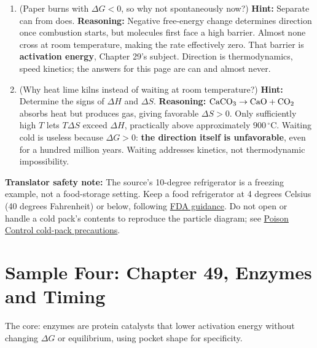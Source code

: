\begin{enumerate}[itemsep=3pt]
\item (Paper burns with $\Delta G<0$, so why not spontaneously now?) \textbf{Hint:} Separate can from does. \textbf{Reasoning:} Negative free-energy change determines direction once combustion starts, but molecules first face a high barrier. Almost none cross at room temperature, making the rate effectively zero. That barrier is \textbf{activation energy}, Chapter 29's subject. Direction is thermodynamics, speed kinetics; the answers for this page are can and almost never.
\item (Why heat lime kilns instead of waiting at room temperature?) \textbf{Hint:} Determine the signs of $\Delta H$ and $\Delta S$. \textbf{Reasoning:} $\mathrm{CaCO_3} \rightarrow \mathrm{CaO} + \mathrm{CO_2}$ absorbs heat but produces gas, giving favorable $\Delta S>0$. Only sufficiently high $T$ lets $T\Delta S$ exceed $\Delta H$, practically above approximately $900\,^{\circ}\mathrm{C}$. Waiting cold is useless because $\Delta G>0$: \textbf{the direction itself is unfavorable}, even for a hundred million years. Waiting addresses kinetics, not thermodynamic impossibility.
\end{enumerate}

\textbf{Translator safety note:} The source's 10-degree refrigerator is a freezing example, not a food-storage setting. Keep a food refrigerator at 4 degrees Celsius (40 degrees Fahrenheit) or below, following \href{https://www.fda.gov/food/buy-store-serve-safe-food/refrigerator-thermometers-cold-facts-about-food-safety}{FDA guidance}. Do not open or handle a cold pack's contents to reproduce the particle diagram; see \href{https://www.poison.org/articles/whats-inside-ice-packs-201}{Poison Control cold-pack precautions}.

\section{Sample Four: Chapter 49, Enzymes and Timing}

The core: enzymes are protein catalysts that lower activation energy without changing $\Delta G$ or equilibrium, using pocket shape for specificity.


